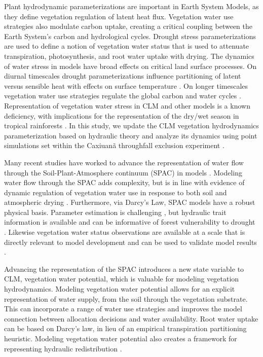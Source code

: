 \documentclass[draft,linenumbers]{agujournal}
\begin{document}
Plant hydrodynamic parameterizations are important in Earth System Models, as they define vegetation regulation of latent heat flux.
Vegetation water use strategies also modulate carbon uptake, creating a critical coupling between the Earth System's carbon and hydrological cycles.
Drought stress parameterizations are used to define a notion of vegetation water status 
that is used to attenuate transpiration, photosynthesis, and root water uptake with drying.
The dynamics of water stress in models have broad effects on critical land surface processes.
On diurnal timescales drought parameterizations influence partitioning of latent versus sensible heat with effects on surface temperature \citep{bonan2014}.
On longer timescales vegetation water use strategies regulate the global carbon and water cycles \citep{dekauwe2015}.
Representation of vegetation water stress in CLM and other models is a known deficiency, with implications for the representation of the dry/wet season in tropical rainforests \citep{powell2013,ukkola2016}.
In this study, we update the CLM vegetation hydrodynamics parameterization based on hydraulic theory and
analyze its dynamics using point simulations set within the Caxiuan\~a throughfall exclusion experiment \citep{fisher2006}.

Many recent studies have worked to advance the representation of water flow through the Soil-Plant-Atmosphere continuum (SPAC) in models \citep{xu2016,christoffersen2016,sperry2017}.
Modeling water flow through the SPAC adds complexity, but is in line with evidence of dynamic regulation of vegetation water use in response to both soil and atmospheric drying \citep{sperry2015}.
Furthermore, via Darcy's Law, SPAC models have a robust physical basis.
Parameter estimation is challenging \citep{drake2017}, but hydraulic trait information is available \citep{kattge2011,anderegg2015a} and can be informative of forest vulnerability to drought \citep{choat2012}.
Likewise vegetation water status observations are available at a scale that is directly relevant to model development \citep{konings2016,grant2016} and can be used to validate model results \citep{momen2017,konings2017b}.

Advancing the representation of the SPAC introduces a new state variable to CLM, vegetation water potential, 
which is valuable for modeling vegetation hydrodynamics.
Modeling vegetation water potential allows for an explicit representation of water supply, from the soil through the vegetation substrate.
This can incorporate a range of water use strategies and improves the model connection between allocation decisions and water availability.
Root water uptake can be based on Darcy's law, in lieu of an empirical transpiration partitioning heuristic.
Modeling vegetation water potential also creates a framework for representing hydraulic redistribution \citep{lee2005}.
\end{document}
